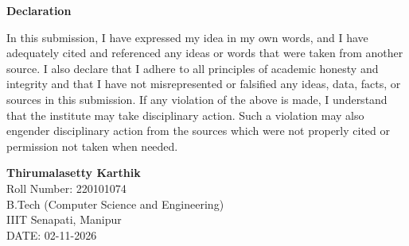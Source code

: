 \documentclass[a4paper, 11pt, oneside]{report}
\begin{document}
    \newpage
    \begin{center}
       { \LARGE \textbf{Declaration}}
    \end{center}
    \vspace{1cm}
    In this submission, I have expressed my idea in my own words, and I have adequately cited and referenced any ideas or words that were taken from another source. I also declare that I adhere to all principles of academic honesty and integrity and that I have not misrepresented or falsified any ideas, data, facts, or sources in this submission. If any violation of the above is made, I understand that the institute may take disciplinary action. Such a violation may also engender disciplinary action from the sources which were not properly cited or permission not taken when needed.

    \vspace{2.5cm}
    \begin{flushright}
        \textbf{Thirumalasetty Karthik} \\
        Roll Number: 220101074 \\
        B.Tech (Computer Science and Engineering) \\
        IIIT Senapati, Manipur \\[0.5cm]
        DATE: 02-11-2026
    \end{flushright}
\end{document}
